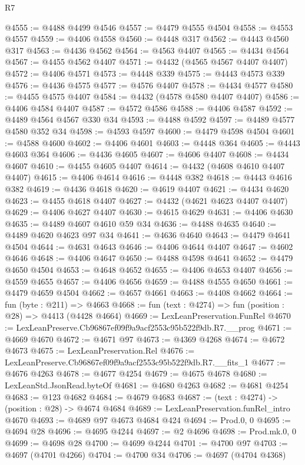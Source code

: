 \begin{lexlean}{R7}
\begin{coremodule}
@4555 := @4488 @4499 @4546
@4557 := @4479 @4555 @4504
@4558 := @4553 @4557
@4559 := @4406 @4558
@4560 := @4448 @317
@4562 := @4443 @4560 @317
@4563 := @4436 @4562
@4564 := @4563 @4407
@4565 := @4434 @4564
@4567 := @4455 @4562 @4407
@4571 := @4432 (@4565 @4567 @4407 @4407)
@4572 := @4406 @4571
@4573 := @4448 @339
@4575 := @4443 @4573 @339
@4576 := @4436 @4575
@4577 := @4576 @4407
@4578 := @4434 @4577
@4580 := @4455 @4575 @4407
@4584 := @4432 (@4578 @4580 @4407 @4407)
@4586 := @4406 @4584 @4407
@4587 := @4572 @4586
@4588 := @4406 @4587
@4592 := @4489 @4564 @4567 @330 @34
@4593 := @4488 @4592
@4597 := @4489 @4577 @4580 @352 @34
@4598 := @4593 @4597
@4600 := @4479 @4598 @4504
@4601 := @4588 @4600
@4602 := @4406 @4601
@4603 := @4448 @364
@4605 := @4443 @4603 @364
@4606 := @4436 @4605
@4607 := @4606 @4407
@4608 := @4434 @4607
@4610 := @4455 @4605 @4407
@4614 := @4432 (@4608 @4610 @4407 @4407)
@4615 := @4406 @4614
@4616 := @4448 @382
@4618 := @4443 @4616 @382
@4619 := @4436 @4618
@4620 := @4619 @4407
@4621 := @4434 @4620
@4623 := @4455 @4618 @4407
@4627 := @4432 (@4621 @4623 @4407 @4407)
@4629 := @4406 @4627 @4407
@4630 := @4615 @4629
@4631 := @4406 @4630
@4635 := @4489 @4607 @4610 @59 @34
@4636 := @4488 @4635
@4640 := @4489 @4620 @4623 @97 @34
@4641 := @4636 @4640
@4643 := @4479 @4641 @4504
@4644 := @4631 @4643
@4646 := @4406 @4644 @4407
@4647 := @4602 @4646
@4648 := @4406 @4647
@4650 := @4488 @4598 @4641
@4652 := @4479 @4650 @4504
@4653 := @4648 @4652
@4655 := @4406 @4653 @4407
@4656 := @4559 @4655
@4657 := @4406 @4656
@4659 := @4488 @4555 @4650
@4661 := @4479 @4659 @4504
@4662 := @4657 @4661
@4663 := @4408 @4662
@4664 := fun (byte : @211) => @4663
@4668 := fun (text : @4274) => fun (position : @28) => @4413 (@4428 @4664)
@4669 := LexLeanPreservation.FunRel
@4670 := LexLeanPreserve.Cb96867ef09f9a9acf2553c95b522f9db.R7.__prog
@4671 := @4669 @4670
@4672 := @4671 @97
@4673 := @4369 @4268
@4674 := @4672 @4673
@4675 := LexLeanPreservation.Rel
@4676 := LexLeanPreserve.Cb96867ef09f9a9acf2553c95b522f9db.R7.__fits_1
@4677 := @4676 @4263
@4678 := @4677 @4254
@4679 := @4675 @4678
@4680 := LexLeanStd.JsonRead.byteOf
@4681 := @4680 @4263
@4682 := @4681 @4254
@4683 := @123 @4682
@4684 := @4679 @4683
@4687 := (text : @4274) -> (position : @28) -> @4674 @4684
@4689 := LexLeanPreservation.funRel_intro @4670
@4693 := @4689 @97 @4673 @4684 @424
@4694 := Prod.{0, 0}
@4695 := @4694 @28
@4696 := @4695 @4244
@4697 := @2 @4696
@4698 := Prod.mk.{0, 0}
@4699 := @4698 @28
@4700 := @4699 @4244
@4701 := @4700 @97
@4703 := @4697 (@4701 @4266)
@4704 := @4700 @34
@4706 := @4697 (@4704 @4368)

\end{coremodule}
\end{lexlean}

